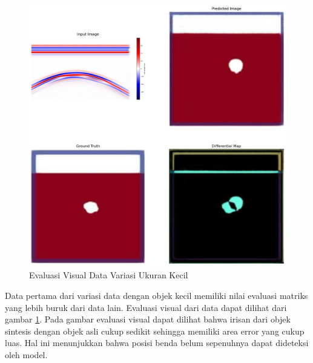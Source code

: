 \begin{figure}[ht]
  \centering
  \includegraphics[scale=0.15]{gambar/diffMapKecil.jpg}
  \caption{Evaluasi Visual Data Variasi Ukuran Kecil}
  \label{fig:diffmapkecil}
\end{figure}

Data pertama dari variasi data dengan objek kecil memiliki nilai evaluasi matriks yang lebih buruk dari data lain. 
Evaluasi visual dari data dapat dilihat dari gambar \ref{fig:diffmapkecil}. 
Pada gambar evaluasi visual dapat dilihat bahwa irisan dari objek sintesis dengan objek asli cukup sedikit sehingga memiliki area error yang cukup luas. 
Hal ini menunjukkan bahwa posisi benda belum sepenuhnya dapat dideteksi oleh model.

